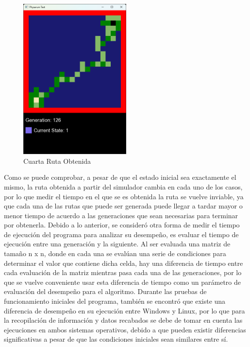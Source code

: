     \begin{figure}[htbp]
        \centering
        \includegraphics[width=0.5\textwidth]{./images/Pruebas/simulador/image017.png}
        \caption{Cuarta Ruta Obtenida}
        \label{fig:Ruta 5}
    \end{figure}
    \vskip 0.5cm
    \clearpage
    Como se puede comprobar, a pesar de que el estado inicial
        sea exactamente el mismo, la ruta obtenida a partir del
        simulador cambia en cada uno de los casos, por lo que medir
        el tiempo en el que se es obtenida la ruta se vuelve inviable,
        ya que cada una de las rutas que puede ser generada puede
        llegar a tardar mayor o menor tiempo de acuerdo a las
        generaciones que sean necesarias para terminar por
        obtenerla.
    \vskip 0.5cm
    Debido a lo anterior, se consider\'o otra forma de medir el
    tiempo de ejecuci\'on del programa para analizar su
    desempe\~no, es evaluar el tiempo de ejecuci\'on entre una
    generaci\'on y la siguiente. Al ser evaluada una matriz de
    tama\~no n x n, donde en cada una se eval\'uan una serie de
    condiciones para determinar el valor que contiene dicha
    celda, hay una diferencia de tiempo entre cada evaluaci\'on de
    la matriz mientras pasa cada una de las generaciones, por lo
    que se vuelve conveniente usar esta diferencia de tiempo
    como un par\'ametro de evaluaci\'on del desempe\~no para el
    algoritmo.
    \vskip 0.5cm
    Durante las pruebas de funcionamiento iniciales del
        programa, tambi\'en se encontr\'o que existe una diferencia de
        desempe\~no en su ejecuci\'on entre Windows y Linux, por lo
        que para la recopilaci\'on de informaci\'on y datos recabados se
        debe de tomar en cuenta las ejecuciones en ambos sistemas
        operativos, debido a que pueden existir diferencias
        significativas a pesar de que las condiciones iniciales sean
        similares entre s\'i.
